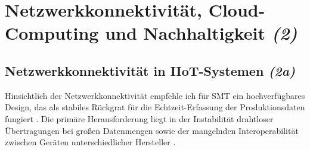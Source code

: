 
\chapter{Netzwerkkonnektivität, Cloud-Computing und Nachhaltigkeit \textit{(2)}}
\label{chap:aufgabe2}
\thispagestyle{fancy}


\section{Netzwerkkonnektivität in \acs{IIoT}-Systemen \textit{(2a)}}
\label{sec:2a}

Hinsichtlich der Netzwerkkonnektivität empfehle ich für \acs{SMT} ein hochverfügbares Design, das als stabiles Rückgrat für die Echtzeit-Erfassung der Produktionsdaten fungiert \cite[6]{2}. Die primäre Herausforderung liegt in der Instabilität drahtloser Übertragungen bei großen Datenmengen sowie der mangelnden Interoperabilität zwischen Geräten unterschiedlicher Hersteller \cite[7,72]{2}.

